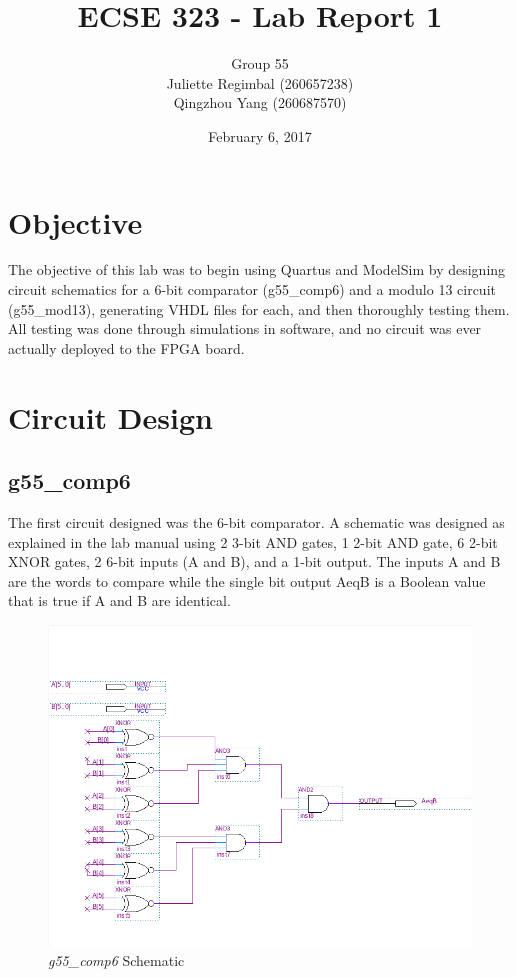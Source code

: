 \documentclass[12pt]{article}
\title{ECSE 323 - Lab Report 1}
\author{Group 55\\Juliette Regimbal (260657238)\\Qingzhou Yang (260687570)}
\date{February 6, 2017}
\begin{document}
\maketitle
\setlength{\parindent}{0ex}

\section{Objective}
The objective of this lab was to begin using Quartus and ModelSim by designing circuit schematics for a 6-bit comparator (g55\_comp6) and a modulo 13 circuit (g55\_mod13), generating VHDL files for each, and then thoroughly testing them. All testing was done through simulations in software, and no circuit was ever actually deployed to the FPGA board.\\

\section{Circuit Design}
\subsection{g55\_comp6}
The first circuit designed was the 6-bit comparator. A schematic was designed as explained in the lab manual using 2 3-bit AND gates, 1 2-bit AND gate, 6 2-bit XNOR gates, 2 6-bit inputs (A and B), and a 1-bit output. The inputs A and B are the words to compare while the single bit output AeqB is a Boolean value that is true if A and B are identical.\\

\begin{figure}[h!t]
	\includegraphics[scale=0.4]{graphics/comp6_schematic.png}
	\caption{\textit{g55\_comp6} Schematic}
\end{figure}
\end{document}
